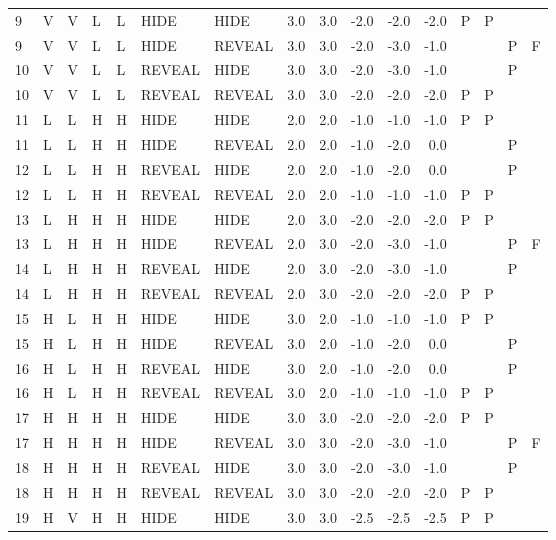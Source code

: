 \begin{longtable}{lllllllrrrrrllll}
  9 & V & V & L & L & HIDE & HIDE & 3.0 & 3.0 & -2.0 & -2.0 & -2.0 & P & P &  &  \\ 
  9 & V & V & L & L & HIDE & REVEAL & 3.0 & 3.0 & -2.0 & -3.0 & -1.0 &  &  & P & F \\ 
  10 & V & V & L & L & REVEAL & HIDE & 3.0 & 3.0 & -2.0 & -3.0 & -1.0 &  &  & P &  \\ 
  10 & V & V & L & L & REVEAL & REVEAL & 3.0 & 3.0 & -2.0 & -2.0 & -2.0 & P & P &  &  \\ 
  11 & L & L & H & H & HIDE & HIDE & 2.0 & 2.0 & -1.0 & -1.0 & -1.0 & P & P &  &  \\ 
  11 & L & L & H & H & HIDE & REVEAL & 2.0 & 2.0 & -1.0 & -2.0 & 0.0 &  &  & P &  \\ 
  12 & L & L & H & H & REVEAL & HIDE & 2.0 & 2.0 & -1.0 & -2.0 & 0.0 &  &  & P &  \\ 
  12 & L & L & H & H & REVEAL & REVEAL & 2.0 & 2.0 & -1.0 & -1.0 & -1.0 & P & P &  &  \\ 
  13 & L & H & H & H & HIDE & HIDE & 2.0 & 3.0 & -2.0 & -2.0 & -2.0 & P & P &  &  \\ 
  13 & L & H & H & H & HIDE & REVEAL & 2.0 & 3.0 & -2.0 & -3.0 & -1.0 &  &  & P & F \\ 
  14 & L & H & H & H & REVEAL & HIDE & 2.0 & 3.0 & -2.0 & -3.0 & -1.0 &  &  & P &  \\ 
  14 & L & H & H & H & REVEAL & REVEAL & 2.0 & 3.0 & -2.0 & -2.0 & -2.0 & P & P &  &  \\ 
  15 & H & L & H & H & HIDE & HIDE & 3.0 & 2.0 & -1.0 & -1.0 & -1.0 & P & P &  &  \\ 
  15 & H & L & H & H & HIDE & REVEAL & 3.0 & 2.0 & -1.0 & -2.0 & 0.0 &  &  & P &  \\ 
  16 & H & L & H & H & REVEAL & HIDE & 3.0 & 2.0 & -1.0 & -2.0 & 0.0 &  &  & P &  \\ 
  16 & H & L & H & H & REVEAL & REVEAL & 3.0 & 2.0 & -1.0 & -1.0 & -1.0 & P & P &  &  \\ 
  17 & H & H & H & H & HIDE & HIDE & 3.0 & 3.0 & -2.0 & -2.0 & -2.0 & P & P &  &  \\ 
  17 & H & H & H & H & HIDE & REVEAL & 3.0 & 3.0 & -2.0 & -3.0 & -1.0 &  &  & P & F \\ 
  18 & H & H & H & H & REVEAL & HIDE & 3.0 & 3.0 & -2.0 & -3.0 & -1.0 &  &  & P &  \\ 
  18 & H & H & H & H & REVEAL & REVEAL & 3.0 & 3.0 & -2.0 & -2.0 & -2.0 & P & P &  &  \\ 
  19 & H & V & H & H & HIDE & HIDE & 3.0 & 3.0 & -2.5 & -2.5 & -2.5 & P & P &  &  \\ 

\end{longtable}
